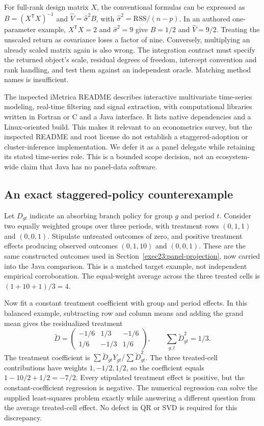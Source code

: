 For full-rank design matrix $X$, the conventional formulas can be expressed
as $B=(X^\mathsf{T}X)^{-1}$ and $\widehat V=\widehat\sigma^2 B$, with
$\widehat\sigma^2=\mathrm{RSS}/(n-p)$. In an authored one-parameter
example, $X^\mathsf{T}X=2$ and $\widehat\sigma^2=9$ give $B=1/2$ and
$\widehat V=9/2$. Treating the unscaled return as covariance loses a factor
of nine. Conversely, multiplying an already scaled matrix again is also wrong.
The integration contract must specify the returned object's scale, residual
degrees of freedom, intercept convention and rank handling, and test them
against an independent oracle. Matching method names is insufficient.
\citep{exec25_paneljava_reference}

The inspected iMetrica README describes interactive multivariate time-series
modeling, real-time filtering and signal extraction, with computational
libraries written in Fortran or C and a Java interface. It lists native
dependencies and a Linux-oriented build. This makes it relevant to an
econometrics survey, but the inspected README and root license do not
establish a staggered-adoption or cluster-inference implementation. We defer
it as a panel delegate while retaining its stated time-series role. This is
a bounded scope decision, not an ecosystem-wide claim that Java has no
panel-data software.~\citep{exec25_paneljava_imetrica}

\subsection{An exact staggered-policy counterexample}
Let $D_{gt}$ indicate an absorbing branch policy for group $g$ and period $t$.
Consider two equally weighted groups over three periods, with treatment rows
$(0,1,1)$ and $(0,0,1)$. Stipulate untreated outcomes of zero, and positive
treatment effects producing observed outcomes $(0,1,10)$ and $(0,0,1)$.
These are the same constructed outcomes used in
Section~\ref{exec23:panel-projection}, now carried into the Java comparison.
This is a matched target example, not independent empirical corroboration.
The equal-weight average across the three treated cells is $(1+10+1)/3=4$.
\citep{exec25_paneljava_reference}

Now fit a constant treatment coefficient with group and period effects. In
this balanced example, subtracting row and column means and adding the grand
mean gives the residualized treatment
\[
\widetilde D=
\begin{pmatrix}-1/6&1/3&-1/6\\1/6&-1/3&1/6\end{pmatrix},
\qquad \sum_{g,t}\widetilde D_{gt}^2=1/3.
\]
The treatment coefficient is $\sum\widetilde D_{gt}Y_{gt}/
\sum\widetilde D_{gt}^2$. The three treated-cell contributions have weights
$1,-1/2,1/2$, so the coefficient equals
$1-10/2+1/2=-7/2$. Every stipulated treatment effect is positive, but the
constant-coefficient regression is negative. The numerical regression can
solve the supplied least-squares problem exactly while answering a different
question from the average treated-cell effect. No defect in QR or SVD is
required for this discrepancy.~\citep{exec25_paneljava_reference}

